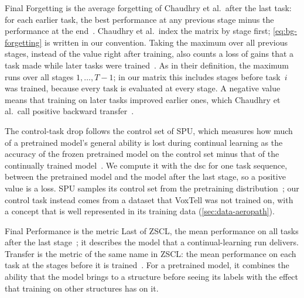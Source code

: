Final Forgetting is the average forgetting of Chaudhry et al.\ after the last task: for each earlier task, the best performance at any previous stage minus the performance at the end~\cite[Sec.~3, Eq.~3]{Chaudhry_2018}.
Chaudhry et al.\ index the matrix by stage first; \cref{eq:bg-forgetting} is written in our convention.
Taking the maximum over all previous stages, instead of the value right after training, also counts a loss of gains that a task made while later tasks were trained~\cite[Sec.~3]{Chaudhry_2018}.
As in their definition, the maximum runs over all stages $1, \dots, T-1$; in our matrix this includes stages before task~$i$ was trained, because every task is evaluated at every stage.
A negative value means that training on later tasks improved earlier ones, which Chaudhry et al.\ call positive backward transfer~\cite[Sec.~3]{Chaudhry_2018}.

The control-task drop follows the control set of SPU, which measures how much of a pretrained model's general ability is lost during continual learning as the accuracy of the frozen pretrained model on the control set minus that of the continually trained model~\cite[Sec.~5.1, Eq.~6]{Zhang_2024_CVPR}.
We compute it with the \gls{dsc} for one task sequence, between the pretrained model and the model after the last stage, so a positive value is a loss.
SPU samples its control set from the pretraining distribution~\cite[Sec.~3]{Zhang_2024_CVPR}; our control task instead comes from a dataset that VoxTell was not trained on, with a concept that is well represented in its training data (\cref{sec:data-aeropath}).

Final Performance is the metric Last of ZSCL, the mean performance on all tasks after the last stage~\cite[Sec.~4, Fig.~4b]{zheng2023preventingzeroshottransferdegradation}; it describes the model that a continual-learning run delivers.
Transfer is the metric of the same name in ZSCL: the mean performance on each task at the stages before it is trained~\cite[Sec.~4, Fig.~4b]{zheng2023preventingzeroshottransferdegradation}.
For a pretrained model, it combines the ability that the model brings to a structure before seeing its labels with the effect that training on other structures has on it.

